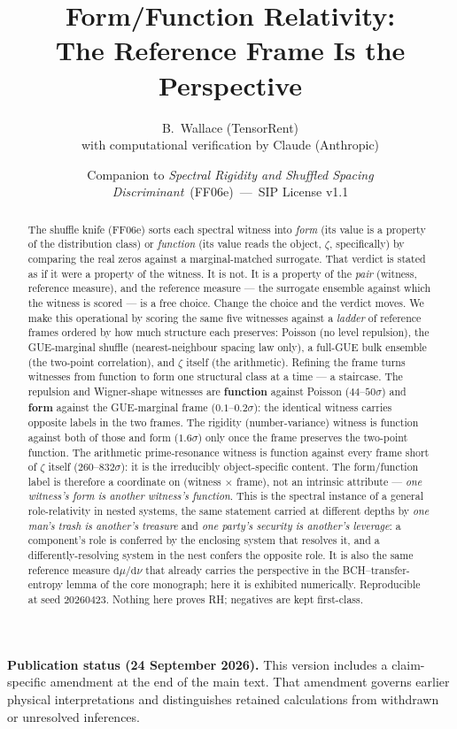 \documentclass[11pt]{article}
\title{\textbf{Form/Function Relativity:\\
The Reference Frame Is the Perspective}}
\author{B.\ Wallace \quad (TensorRent)\\ \small with computational verification by Claude (Anthropic)}
\date{\small Companion to \textit{Spectral Rigidity and Shuffled Spacing Discriminant}\ (FF06e)\ ---\ SIP License v1.1}
\theoremstyle{definition}
\theoremstyle{plain}
\begin{document}
\maketitle

\begin{abstract}
The shuffle knife (FF06e) sorts each spectral witness into \emph{form} (its value is a property of the distribution class) or \emph{function} (its value reads the object, $\zeta$, specifically) by comparing the real zeros against a marginal-matched surrogate. That verdict is stated as if it were a property of the witness. It is not. It is a property of the \emph{pair} (witness, reference measure), and the reference measure --- the surrogate ensemble against which the witness is scored --- is a free choice. Change the choice and the verdict moves. We make this operational by scoring the same five witnesses against a \emph{ladder} of reference frames ordered by how much structure each preserves: Poisson (no level repulsion), the GUE-marginal shuffle (nearest-neighbour spacing law only), a full-GUE bulk ensemble (the two-point correlation), and $\zeta$ itself (the arithmetic). Refining the frame turns witnesses from function to form one structural class at a time --- a staircase. The repulsion and Wigner-shape witnesses are \textbf{function} against Poisson ($44$--$50\sigma$) and \textbf{form} against the GUE-marginal frame ($0.1$--$0.2\sigma$): the identical witness carries opposite labels in the two frames. The rigidity (number-variance) witness is function against both of those and form ($1.6\sigma$) only once the frame preserves the two-point function. The arithmetic prime-resonance witness is function against every frame short of $\zeta$ itself ($260$--$832\sigma$): it is the irreducibly object-specific content. The form/function label is therefore a coordinate on (witness $\times$ frame), not an intrinsic attribute --- \emph{one witness's form is another witness's function}. This is the spectral instance of a general role-relativity in nested systems, the same statement carried at different depths by \emph{one man's trash is another's treasure} and \emph{one party's security is another's leverage}: a component's role is conferred by the enclosing system that resolves it, and a differently-resolving system in the nest confers the opposite role. It is also the same reference measure $\mathrm{d}\mu/\mathrm{d}\nu$ that already carries the perspective in the BCH--transfer-entropy lemma of the core monograph; here it is exhibited numerically. Reproducible at seed $20260423$. Nothing here proves RH; negatives are kept first-class.
\end{abstract}
\par\smallskip\noindent\textbf{Publication status (24 September 2026).}
This version includes a claim-specific amendment at the end of the main text.
That amendment governs earlier physical interpretations and distinguishes
retained calculations from withdrawn or unresolved inferences.\par\smallskip
\end{document}
